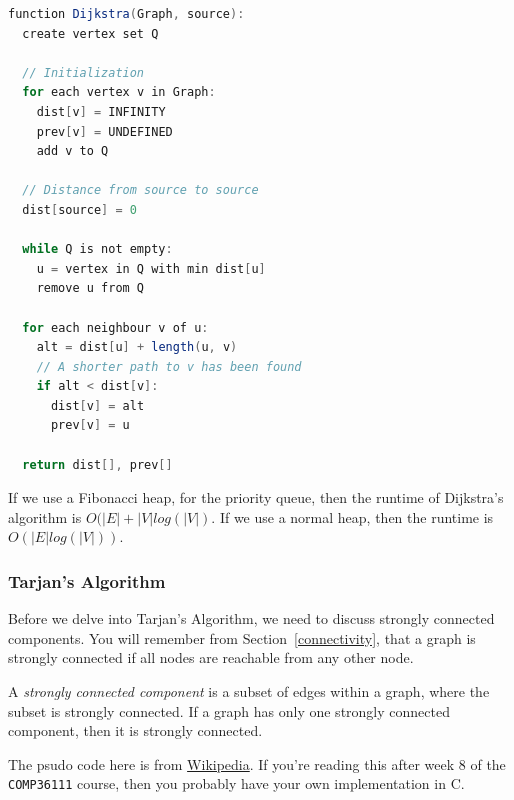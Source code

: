 
\begin{lstlisting}[language=java,
                  caption=Dijkstra's algorithm (from Wikipedia),
                  label=lst:dijkstra,
                  captionpos=b]
function Dijkstra(Graph, source):
  create vertex set Q

  // Initialization
  for each vertex v in Graph:
    dist[v] = INFINITY
    prev[v] = UNDEFINED
    add v to Q

  // Distance from source to source
  dist[source] = 0

  while Q is not empty:
    u = vertex in Q with min dist[u]
    remove u from Q 

  for each neighbour v of u:
    alt = dist[u] + length(u, v)
    // A shorter path to v has been found
    if alt < dist[v]:
      dist[v] = alt 
      prev[v] = u 

  return dist[], prev[]
\end{lstlisting}


If we use a Fibonacci heap, for the priority queue, then the runtime of
Dijkstra's algorithm is $O(|E| + |V|log(|V|)$. If we use a normal heap, then the
runtime is $O(|E|log(|V|))$.

\subsubsection{Tarjan's Algorithm}

Before we delve into Tarjan's Algorithm, we need to discuss strongly connected
components. You will remember from Section~\ref{connectivity}, that a graph is
strongly connected if all nodes are reachable from any other node.

A \textit{strongly connected component} is a subset of edges within a graph,
where the subset is strongly connected. If a graph has only one strongly
connected component, then it is strongly connected.

The psudo code here is from
\href{https://en.wikipedia.org/wiki/Tarjan%27s_strongly_connected_components_algorithm}{Wikipedia}.
If you're reading this after week 8 of the \texttt{COMP36111} course, then you
probably have your own implementation in C.

